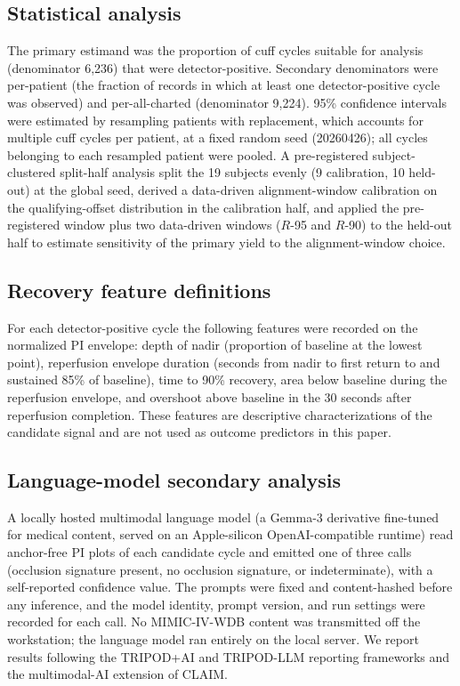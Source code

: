 \documentclass[twocolumn,letterpaper,10pt]{article}
\begin{document}
\subsection{Statistical analysis}

The primary estimand was the proportion of cuff cycles suitable for analysis (denominator 6{,}236) that were detector-positive. Secondary denominators were per-patient (the fraction of records in which at least one detector-positive cycle was observed) and per-all-charted (denominator 9{,}224). 95\% confidence intervals were estimated by resampling patients with replacement, which accounts for multiple cuff cycles per patient, at a fixed random seed (20260426); all cycles belonging to each resampled patient were pooled. A pre-registered subject-clustered split-half analysis split the 19 subjects evenly (9 calibration, 10 held-out) at the global seed, derived a data-driven alignment-window calibration on the qualifying-offset distribution in the calibration half, and applied the pre-registered window plus two data-driven windows ($R$-95 and $R$-90) to the held-out half to estimate sensitivity of the primary yield to the alignment-window choice.

\subsection{Recovery feature definitions}

For each detector-positive cycle the following features were recorded on the normalized PI envelope: depth of nadir (proportion of baseline at the lowest point), reperfusion envelope duration (seconds from nadir to first return to and sustained 85\% of baseline), time to 90\% recovery, area below baseline during the reperfusion envelope, and overshoot above baseline in the 30 seconds after reperfusion completion. These features are descriptive characterizations of the candidate signal and are not used as outcome predictors in this paper.

\subsection{Language-model secondary analysis}

A locally hosted multimodal language model (a Gemma-3 derivative fine-tuned for medical content, served on an Apple-silicon OpenAI-compatible runtime) read anchor-free PI plots of each candidate cycle and emitted one of three calls (occlusion signature present, no occlusion signature, or indeterminate), with a self-reported confidence value. The prompts were fixed and content-hashed before any inference, and the model identity, prompt version, and run settings were recorded for each call. No MIMIC-IV-WDB content was transmitted off the workstation; the language model ran entirely on the local server. We report results following the TRIPOD+AI\cite{collins2024_tripod_ai} and TRIPOD-LLM\cite{gallifant2025_tripod_llm} reporting frameworks and the multimodal-AI extension of CLAIM.\cite{tejani2024_claim}
\end{document}
